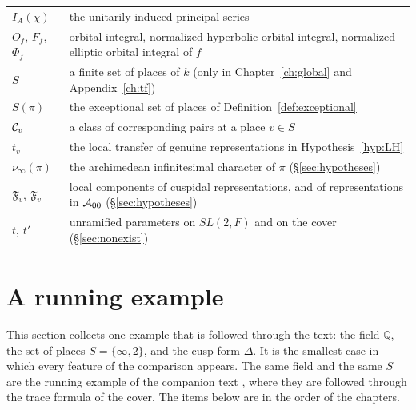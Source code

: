 \documentclass[12pt,letterpaper,openany]{book}
\theoremstyle{plain}
\theoremstyle{definition}
\theoremstyle{remark}
\theoremstyle{remark}
\begin{document}
\begin{center}
\begin{tabular}{p{}p{}}
$I_A(\chi)$ & the unitarily induced principal series\\
$O_f$, $F_f$, $\Phi_f$ & orbital integral, normalized hyperbolic orbital
integral, normalized elliptic orbital integral of $f$\\
$S$ & a finite set of places of $k$ (only in Chapter~\ref{ch:global}
and Appendix~\ref{ch:tf})\\
$S(\pi)$ & the exceptional set of places of
Definition~\ref{def:exceptional}\\
${\cal C}_v$ & a class of corresponding pairs at a place $v\in S$\\
$t_v$ & the local transfer of genuine representations in
Hypothesis~\ref{hyp:LH}\\
$\nu_\infty(\pi)$ & the archimedean infinitesimal character of $\pi$
(\S\ref{sec:hypotheses})\\
$\mathfrak{F}_v$, $\overline{\mathfrak{F}}_v$ & local components of cuspidal
representations, and of representations in ${\cal A}_{00}$
(\S\ref{sec:hypotheses})\\
$t$, $t'$ & unramified parameters on $SL(2,F)$ and on the cover
(\S\ref{sec:nonexist})\\
\hline
\end{tabular}
\end{center}


\section{A running example}\label{sec:running}

This section collects one example that is followed through the text:
the field ${\mathbb Q}$, the set of places $S=\{\infty,2\}$, and the cusp
form $\Delta$. It is the smallest case in which every feature of the
comparison appears. The same field and the same $S$ are the running
example of the companion text \cite[\S1.3]{JC}, where they are followed
through the trace formula of the cover. The items below are in the order
of the chapters.
\end{document}
